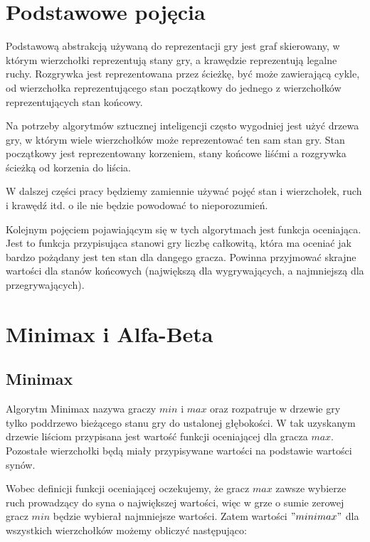 \documentclass{pracamgr}
\begin{document}
\section{Podstawowe pojęcia}

Podstawową abstrakcją używaną do reprezentacji gry jest graf skierowany, w którym wierzchołki reprezentują stany gry, a krawędzie reprezentują legalne ruchy. Rozgrywka jest reprezentowana przez ścieżkę, być może zawierającą cykle, od wierzchołka reprezentującego stan początkowy do jednego z wierzchołków reprezentujących stan końcowy.

Na potrzeby algorytmów sztucznej inteligencji często wygodniej jest użyć drzewa gry, w którym wiele wierzchołków może reprezentować ten sam stan gry. Stan początkowy jest reprezentowany korzeniem, stany końcowe liśćmi a rozgrywka ścieżką od korzenia do liścia.

W dalszej części pracy będziemy zamiennie używać pojęć stan i wierzchołek, ruch i krawędź itd. o ile nie będzie powodować to nieporozumień.

Kolejnym pojęciem pojawiającym się w tych algorytmach jest funkcja oceniająca. Jest to funkcja przypisująca stanowi gry liczbę całkowitą, która ma oceniać jak bardzo pożądany jest ten stan dla dangego gracza. Powinna przyjmować skrajne wartości dla stanów końcowych (największą dla wygrywających, a najmniejszą dla przegrywających).

\section{Minimax i Alfa-Beta}

\subsection{Minimax}

Algorytm Minimax nazywa graczy \(min\) i \(max\) oraz rozpatruje w drzewie gry tylko poddrzewo bieżącego stanu gry do ustalonej głębokości. W tak uzyskanym drzewie liściom przypisana jest wartość funkcji oceniającej dla gracza \(max\). Pozostałe wierzchołki będą miały przypisywane wartości na podstawie wartości synów.

Wobec definicji funkcji oceniającej oczekujemy, że gracz \(max\) zawsze wybierze ruch prowadzący do syna o największej wartości, więc w grze o sumie zerowej gracz \(min\) będzie wybierał najmniejsze wartości. Zatem wartości \("minimax"\) dla wszystkich wierzchołków możemy obliczyć następująco:
\end{document}
